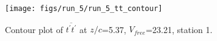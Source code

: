 \begin{figure}[H]
\centering
\texttt{[image: figs/run\_5/run\_5\_tt\_contour]}
\caption{Contour plot of $\overline{t^\prime t^\prime}$ at $z/c$=5.37, $V_{free}$=23.21, station 1.}
\label{fig:run_5_tt_contour}
\end{figure}


